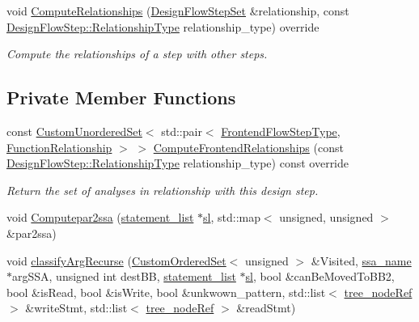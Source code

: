 \begin{DoxyCompactItemize}
void \hyperlink{classinterface__infer_adaf46bd679e004e36be194484e47e54e}{Compute\+Relationships} (\hyperlink{classDesignFlowStepSet}{Design\+Flow\+Step\+Set} \&relationship, const \hyperlink{classDesignFlowStep_a723a3baf19ff2ceb77bc13e099d0b1b7}{Design\+Flow\+Step\+::\+Relationship\+Type} relationship\+\_\+type) override
\begin{DoxyCompactList}\small\item\em Compute the relationships of a step with other steps. \end{DoxyCompactList}\end{DoxyCompactItemize}
\subsection*{Private Member Functions}
\begin{DoxyCompactItemize}
\item 
const \hyperlink{classCustomUnorderedSet}{Custom\+Unordered\+Set}$<$ std\+::pair$<$ \hyperlink{frontend__flow__step_8hpp_afeb3716c693d2b2e4ed3e6d04c3b63bb}{Frontend\+Flow\+Step\+Type}, \hyperlink{classFrontendFlowStep_af7cf30f2023e5b99e637dc2058289ab0}{Function\+Relationship} $>$ $>$ \hyperlink{classinterface__infer_a160b24c511a07dff732ed211f01bb81a}{Compute\+Frontend\+Relationships} (const \hyperlink{classDesignFlowStep_a723a3baf19ff2ceb77bc13e099d0b1b7}{Design\+Flow\+Step\+::\+Relationship\+Type} relationship\+\_\+type) const override
\begin{DoxyCompactList}\small\item\em Return the set of analyses in relationship with this design step. \end{DoxyCompactList}\item 
void \hyperlink{classinterface__infer_a5da918cda06334bf2d7b6828c90ede34}{Computepar2ssa} (\hyperlink{structstatement__list}{statement\+\_\+list} $\ast$\hyperlink{tutorial__pnnl__2019_2optimizations_2second_2solution_2adpcm_8c_ace9c0991f7fffe6ab436175d7fff821e}{sl}, std\+::map$<$ unsigned, unsigned $>$ \&par2ssa)
\item 
void \hyperlink{classinterface__infer_ab036c9a72e643238236d229c1eb875a6}{classify\+Arg\+Recurse} (\hyperlink{classCustomOrderedSet}{Custom\+Ordered\+Set}$<$ unsigned $>$ \&Visited, \hyperlink{structssa__name}{ssa\+\_\+name} $\ast$arg\+S\+SA, unsigned int dest\+BB, \hyperlink{structstatement__list}{statement\+\_\+list} $\ast$\hyperlink{tutorial__pnnl__2019_2optimizations_2second_2solution_2adpcm_8c_ace9c0991f7fffe6ab436175d7fff821e}{sl}, bool \&can\+Be\+Moved\+To\+B\+B2, bool \&is\+Read, bool \&is\+Write, bool \&unkwown\+\_\+pattern, std\+::list$<$ \hyperlink{tree__node_8hpp_a6ee377554d1c4871ad66a337eaa67fd5}{tree\+\_\+node\+Ref} $>$ \&write\+Stmt, std\+::list$<$ \hyperlink{tree__node_8hpp_a6ee377554d1c4871ad66a337eaa67fd5}{tree\+\_\+node\+Ref} $>$ \&read\+Stmt)

\end{DoxyCompactItemize}

